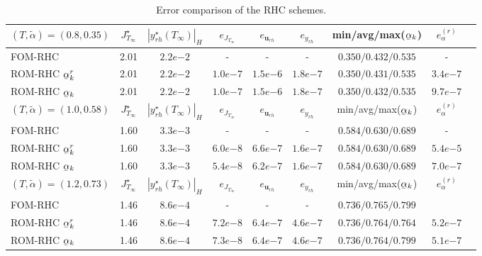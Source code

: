 \documentclass{m2an}
\newcommand{\bu}{\mathbf{u}}
\newcommand{\ubar}[1]{\underaccent{\bar}{#1}}
\begin{document}
\begin{table}[ht!] 
    \scriptsize
	\centering 
    \caption{Error comparison of the RHC schemes.}
	\label{fig:RHC_error_comp}
	  \begin{tabular}{lcccccccc}\toprule
		$(T,\tilde \alpha)=(0.8,0.35)$ & $J^\star_{T_\infty}$ & $|y^\star_{rh}(T_\infty)|_H$ & $e_{J_{T_\infty}}$  & $e_{\bu_{rh}}$ & $e_{y_{rh}}$   & min/avg/max($\ubar\alpha_k$) & $e^{(r)}_\alpha$ \\ 
        \midrule
		FOM-RHC & 2.01  & $2.2e{-2}$  &  - & - &- & $0.350/0.432/0.535$ & -\\
        ROM-RHC $\ubar \alpha_k^{r}$   &2.01 & $2.2e{-2}$ & $1.0e{-7}$ & $1.5e{-6}$ &$1.8e{-7}$&$0.350/0.431/0.535$& $3.4e{-7}$ \\
        ROM-RHC $\ubar \alpha_k$   &2.01 & $2.2e{-2}$ & $1.0e{-7}$ & $1.5e{-6}$ & $1.8e{-7}$ &$ 0.350/0.432/0.535$& $9.7e{-7}$\\
		\midrule
        $(T,\tilde \alpha)=(1.0,0.58)$ & $J^\star_{T_\infty}$ & $|y^\star_{rh}(T_\infty)|_H$ & $e_{J_{T_\infty}}$  & $e_{\bu_{rh}}$ & $e_{y_{rh}}$   & min/avg/max($\ubar\alpha_k$) & $e^{(r)}_\alpha$ \\  
        \midrule
		FOM-RHC & 1.60  & $3.3e{-3}$  &  - & - &- & $0.584/0.630/0.689$ &-\\
        ROM-RHC $\ubar \alpha_k^{r}$   &1.60 & $3.3e{-3}$ & $6.0e{-8}$ & $6.6e{-7}$ & $1.6e{-7}$ &$0.584/0.630/0.689$&$5.4e{-5}$\\
        ROM-RHC $\ubar \alpha_k$   &1.60  & $3.3e{-3}$ & $5.4e{-8}$ & $6.2e{-7}$ &$1.6e{-7}$&$0.584/0.630/0.689$&$7.0e{-7}$\\
        \midrule
        $(T,\tilde \alpha)=(1.2,0.73)$  & $J^\star_{T_\infty}$ & $|y^\star_{rh}(T_\infty)|_H$ & $e_{J_{T_\infty}}$  & $e_{\bu_{rh}}$ & $e_{y_{rh}}$   & min/avg/max($\ubar\alpha_k$) & $e^{(r)}_\alpha$ \\  
        \midrule
		FOM-RHC & 1.46  & $8.6e{-4}$  &  - & - &- & $0.736/0.765/0.799$ &\\
        ROM-RHC $\ubar \alpha_k^{r}$   &1.46  &  $8.6e{-4}$& $7.2e{-8}$ & $6.4e{-7}$ & $4.6e{-7}$ & $0.736/0.764/0.764$&$5.2e{-7}$\\
        ROM-RHC $\ubar \alpha_k$ &1.46  & $8.6e{-4}$ & $7.3e{-8}$ & $6.4e{-7}$ &$4.6e{-7}$& $0.736/0.764/0.799$&$5.1e{-7}$\\
		\bottomrule
	\end{tabular}
    
\end{table}
\end{document}
